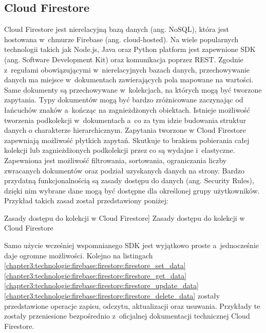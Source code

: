 \documentclass[../Kamil_Kowalewski_Main.tex]{subfiles}
\begin{document}
{{        \subsection{Cloud Firestore}
        \label{chapter3:technologie:firebase:firestore} {
            Cloud Firestore jest nierelacyjną bazą danych (ang. NoSQL), która jest
            hostowana w~chmurze Firebase (ang. cloud-hosted). Na wiele popularnych technologii
            takich jak Node.js, Java oraz Python platform jest zapewnione SDK
            (ang. Software Development Kit) oraz komunikacja poprzez
            REST\cite{website:rest}. Zgodnie z~regułami obowiązującymi w~nierelacyjnych
            bazach danych, przechowywanie danych ma miejsce w~dokumentach zawierających
            pola mapowane na wartości. Same dokumenty są przechowywane w~kolekcjach,
            na których mogą być tworzone zapytania. Typy dokumentów mogą być bardzo
            zróżnicowane zaczynając od łańcuchów znaków a~kończąc na zagnieżdżonych
            obiektach. Istnieje możliwość tworzenia podkolekcji w~dokumentach a~co za
            tym idzie budowania struktur danych o charakterze hierarchicznym. Zapytania
            tworzone w Cloud Firestore zapewniają możliwość płytkich zapytań.
            Skutkuje to brakiem pobierania całej kolekcji lub zagnieżdżonych podkolekcji
            przez co są wydajne i~elastyczne. Zapewniona jest możliwość filtrowania,
            sortowania, ograniczania liczby zwracanych dokumentów oraz podział
            uzyskanych danych na strony. Bardzo przydatną funkcjonalnością są zasady
            dostępu do danych (ang. Security Rules), dzięki nim wybrane dane mogą być
            dostępne dla określonej grupy użytkowników. Przykład takich zasad został
            przedstawiony poniżej:
            \begin{code}[H]
                
                \caption
                [Zasady dostępu do kolekcji w Cloud Firestore]
                {Zasady dostępu do kolekcji w Cloud Firestore}
                \label{chapter3:technologie:firebase:firestore:firestore_rules}
            \end{code}

            Samo użycie wcześniej wspomnianego SDK jest wyjątkowo proste a~jednocześnie
            daje ogromne możliwości. Kolejno na listingach
            \ref{chapter3:technologie:firebase:firestore:firestore_set_data}
            \ref{chapter3:technologie:firebase:firestore:firestore_get_data}
            \ref{chapter3:technologie:firebase:firestore:firestore_update_data}
            \ref{chapter3:technologie:firebase:firestore:firestore_delete_data}
            zostały przedstawione operacje zapisu, odczytu, aktualizacji oraz usuwania.
            Przykłady te zostały przeniesione bezpośrednio z~oficjalnej dokumentacji technicznej
            Cloud Firestore\cite{website:firebase}.

}}}
\end{document}
